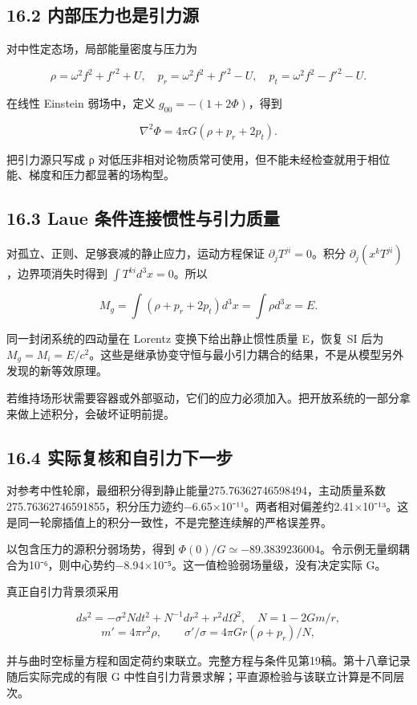 \documentclass[UTF8,fontset=fandol,11pt]{ctexart}
\begin{document}
\subsection*{16.2 内部压力也是引力源}

对中性定态场，局部能量密度与压力为

\[
\rho=\omega^2f^2+f'^2+U,\quad
p_r=\omega^2f^2+f'^2-U,\quad
p_t=\omega^2f^2-f'^2-U.
\tag{16.1}
\]

在线性 Einstein 弱场中，定义 \(g_{00}=-(1+2\Phi)\)，得到

\[
\nabla^2\Phi=4\pi G(\rho+p_r+2p_t).
\tag{16.2}
\]

把引力源只写成 ρ 对低压非相对论物质常可使用，但不能未经检查就用于相位能、梯度和压力都显著的场构型。

\subsection*{16.3 Laue 条件连接惯性与引力质量}

对孤立、正则、足够衰减的静止应力，运动方程保证 \(\partial_jT^{ji}=0\)。积分 \(\partial_j(x^kT^{ji})\)，边界项消失时得到 \(\int T^{ki}d^3x=0\)。所以

\[
M_g=\int(\rho+p_r+2p_t)d^3x=\int\rho d^3x=E.
\tag{16.3}
\]

同一封闭系统的四动量在 Lorentz 变换下给出静止惯性质量 E，恢复 SI 后为 \(M_g=M_i=E/c^2\)。这些是继承协变守恒与最小引力耦合的结果，不是从模型另外发现的新等效原理。

若维持场形状需要容器或外部驱动，它们的应力必须加入。把开放系统的一部分拿来做上述积分，会破坏证明前提。

\subsection*{16.4 实际复核和自引力下一步}

对参考中性轮廓，最细积分得到静止能量275.76362746598494，主动质量系数275.76362746591855，积分压力迹约−6.65×10⁻¹¹。两者相对偏差约2.41×10⁻¹³。这是同一轮廓插值上的积分一致性，不是完整连续解的严格误差界。

以包含压力的源积分弱场势，得到 \(\Phi(0)/G\simeq-89.3839236004\)。令示例无量纲耦合为10⁻⁶，则中心势约−8.94×10⁻⁵。这一值检验弱场量级，没有决定实际 G。

真正自引力背景须采用

\[
ds^2=-\sigma^2Ndt^2+N^{-1}dr^2+r^2d\Omega^2,
\quad N=1-2Gm/r,
\]
\[
m'=4\pi r^2\rho,\qquad
\sigma'/\sigma=4\pi Gr(\rho+p_r)/N,
\tag{16.4}
\]

并与曲时空标量方程和固定荷约束联立。完整方程与条件见第19稿。第十八章记录随后实际完成的有限 G 中性自引力背景求解；平直源检验与该联立计算是不同层次。
\end{document}
